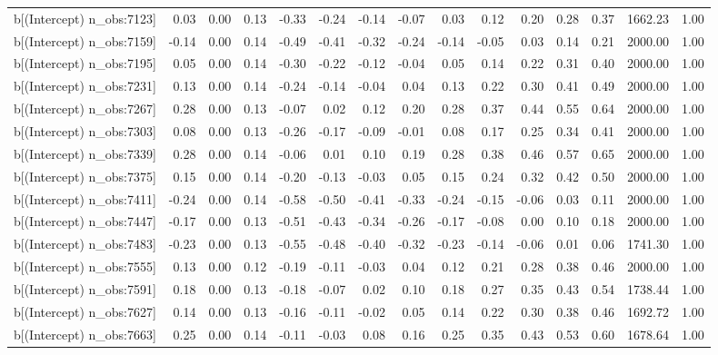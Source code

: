 \begin{table}[ht]
\begin{tabular}{rrrrrrrrrrrrrrr}
  b[(Intercept) n\_obs:7123] & 0.03 & 0.00 & 0.13 & -0.33 & -0.24 & -0.14 & -0.07 & 0.03 & 0.12 & 0.20 & 0.28 & 0.37 & 1662.23 & 1.00 \\ 
  b[(Intercept) n\_obs:7159] & -0.14 & 0.00 & 0.14 & -0.49 & -0.41 & -0.32 & -0.24 & -0.14 & -0.05 & 0.03 & 0.14 & 0.21 & 2000.00 & 1.00 \\ 
  b[(Intercept) n\_obs:7195] & 0.05 & 0.00 & 0.14 & -0.30 & -0.22 & -0.12 & -0.04 & 0.05 & 0.14 & 0.22 & 0.31 & 0.40 & 2000.00 & 1.00 \\ 
  b[(Intercept) n\_obs:7231] & 0.13 & 0.00 & 0.14 & -0.24 & -0.14 & -0.04 & 0.04 & 0.13 & 0.22 & 0.30 & 0.41 & 0.49 & 2000.00 & 1.00 \\ 
  b[(Intercept) n\_obs:7267] & 0.28 & 0.00 & 0.13 & -0.07 & 0.02 & 0.12 & 0.20 & 0.28 & 0.37 & 0.44 & 0.55 & 0.64 & 2000.00 & 1.00 \\ 
  b[(Intercept) n\_obs:7303] & 0.08 & 0.00 & 0.13 & -0.26 & -0.17 & -0.09 & -0.01 & 0.08 & 0.17 & 0.25 & 0.34 & 0.41 & 2000.00 & 1.00 \\ 
  b[(Intercept) n\_obs:7339] & 0.28 & 0.00 & 0.14 & -0.06 & 0.01 & 0.10 & 0.19 & 0.28 & 0.38 & 0.46 & 0.57 & 0.65 & 2000.00 & 1.00 \\ 
  b[(Intercept) n\_obs:7375] & 0.15 & 0.00 & 0.14 & -0.20 & -0.13 & -0.03 & 0.05 & 0.15 & 0.24 & 0.32 & 0.42 & 0.50 & 2000.00 & 1.00 \\ 
  b[(Intercept) n\_obs:7411] & -0.24 & 0.00 & 0.14 & -0.58 & -0.50 & -0.41 & -0.33 & -0.24 & -0.15 & -0.06 & 0.03 & 0.11 & 2000.00 & 1.00 \\ 
  b[(Intercept) n\_obs:7447] & -0.17 & 0.00 & 0.13 & -0.51 & -0.43 & -0.34 & -0.26 & -0.17 & -0.08 & 0.00 & 0.10 & 0.18 & 2000.00 & 1.00 \\ 
  b[(Intercept) n\_obs:7483] & -0.23 & 0.00 & 0.13 & -0.55 & -0.48 & -0.40 & -0.32 & -0.23 & -0.14 & -0.06 & 0.01 & 0.06 & 1741.30 & 1.00 \\ 
  b[(Intercept) n\_obs:7555] & 0.13 & 0.00 & 0.12 & -0.19 & -0.11 & -0.03 & 0.04 & 0.12 & 0.21 & 0.28 & 0.38 & 0.46 & 2000.00 & 1.00 \\ 
  b[(Intercept) n\_obs:7591] & 0.18 & 0.00 & 0.13 & -0.18 & -0.07 & 0.02 & 0.10 & 0.18 & 0.27 & 0.35 & 0.43 & 0.54 & 1738.44 & 1.00 \\ 
  b[(Intercept) n\_obs:7627] & 0.14 & 0.00 & 0.13 & -0.16 & -0.11 & -0.02 & 0.05 & 0.14 & 0.22 & 0.30 & 0.38 & 0.46 & 1692.72 & 1.00 \\ 
  b[(Intercept) n\_obs:7663] & 0.25 & 0.00 & 0.14 & -0.11 & -0.03 & 0.08 & 0.16 & 0.25 & 0.35 & 0.43 & 0.53 & 0.60 & 1678.64 & 1.00 \\ 

\end{tabular}
\end{table}
